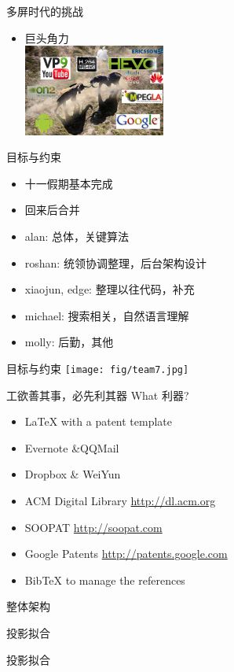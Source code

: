 \documentclass{beamer}
\begin{document}
\begin{frame}{多屏时代的挑战}
\begin{itemize}
\item 巨头角力\\
\includegraphics[height=3cm]{fig/competition.png}\pause
\end{itemize}
\end{frame}
\begin{frame}{目标与约束}
\begin{itemize}
\item 十一假期基本完成
\item 回来后合并
\item alan: 总体，关键算法
\item roshan: 统领协调整理，后台架构设计
\item xiaojun, edge: 整理以往代码，补充
\item michael: 搜索相关，自然语言理解
\item molly: 后勤，其他
\end{itemize}
\end{frame}
\begin{frame}{目标与约束}
\texttt{[image: fig/team7.jpg]}
\end{frame}
\begin{frame}{工欲善其事，必先利其器}
What 利器?
\pause
\begin{itemize}
\item \LaTeX{} with a patent template
\item Evernote \&QQMail
\item Dropbox \& WeiYun
\item ACM Digital Library \url{http://dl.acm.org}
\item SOOPAT \url{http://soopat.com} 
\item Google Patents \url{http://patents.google.com}
\item BibTeX to manage the references
\end{itemize}
\end{frame}
\begin{frame}{整体架构}

\end{frame}
\begin{frame}{投影拟合}

\end{frame}
\begin{frame}{投影拟合}

\end{frame}
\end{document}
